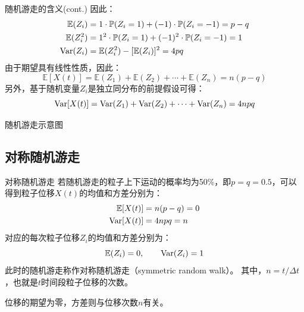 \documentclass[t]{beamer}
\renewcommand{\Pr}{\mathbb{P}}
\newcommand{\E}{\mathbb{E}}
\newcommand{\Var}{{\rm Var}}
\begin{document}
\begin{frame}{随机游走的含义(cont.)}
  因此：\[\begin{split}
    \E(Z_i)&=1 \cdot \Pr(Z_i=1)+(-1)\cdot \Pr(Z_i=-1)=p-q\\
    \E(Z_i^2)&=1^2 \cdot \Pr(Z_i=1)+(-1)^2\cdot \Pr(Z_i=-1)=1\\
    \Var(Z_i)&=\E(Z_i^2)-[\E(Z_i)]^2=4pq
    \end{split}
    \]
    由于期望具有线性性质，因此：
\begin{equation*}
\E[X(t)]=\E(Z_1)+\E(Z_2)+\cdots +\E(Z_n)=n(p-q)
\end{equation*}
另外，基于随机变量$Z_i$是独立同分布的前提假设可得：
\begin{equation*}
\Var[X(t)]=\Var(Z_1)+\Var(Z_2)+\cdots +\Var(Z_n)=4npq
\end{equation*}
\end{frame}


\begin{frame}{随机游走示意图}
  \centering
\end{frame}

\subsection{对称随机游走}
\begin{frame}{对称随机游走}
  若随机游走的粒子上下运动的概率均为50\%，即$p=q=0.5$，可以得到粒子位移$X(t)$的均值和方差分别为：
  \begin{equation*}
  \begin{split}
  \E[X(t)]&=n(p-q) = 0\\
  \Var[X(t)]&=4npq=n
  \end{split}
  \end{equation*}
  对应的每次粒子位移$Z_i$的均值和方差分别为：
  \begin{equation*}
  \E(Z_i)=0,\qquad \Var(Z_i)=1
  \end{equation*}
  此时的随机游走称作对称随机游走（symmetric random walk）。
其中，$n=t/\Delta t$，也就是$t$时间段粒子位移的次数。

\begin{block}{}\centering
  位移的期望为零，方差则与位移次数$n$有关。
\end{block}
\end{frame}
\end{document}
